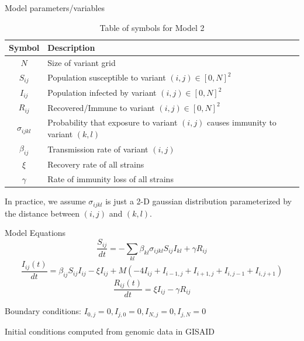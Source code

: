 \documentclass{beamer}
\begin{document}
\begin{frame}{Model parameters/variables}
    \begin{table}[h!]
        \begin{center}
        \begin{tabular}{c|p{8cm}}
                Symbol & Description \\
                \hline
                \hline
                $N$ & Size of variant grid \\
                $S_{ij}$ & Population susceptible to variant $(i,j) \in [0,N]^2$ \\
                $I_{ij}$ & Population infected by variant $(i,j) \in [0,N]^2$\\
                $R_{ij}$ & Recovered/Immune to variant $(i,j) \in [0,N]^2$\\
                $\sigma_{ijkl}$ & Probability that exposure to variant $(i,j)$ causes immunity \newline to variant $(k,l)$\\
                $\beta_{ij}$ & Transmission rate of variant $(i,j)$\\
                $\xi$ & Recovery rate of all strains \\
                $\gamma$ & Rate of immunity loss of all strains \\
        \end{tabular}
        \caption{Table of symbols for Model 2}
    
        \label{variables_2}
        \end{center}
    \end{table}
    In practice, we assume $\sigma_{ijkl}$ is just a 2-D gaussian distribution parameterized by the distance between $(i,j)$ and $(k,l)$.
\end{frame}
\begin{frame}{Model Equations}
    \small
    \begin{equation}
        \frac{S_{ij}}{dt} = -\sum_{kl} \beta_{kl} \sigma_{ijkl} S_{ij} I_{kl} + \gamma R_{ij}  \label{Seqn}
    \end{equation}
    \begin{equation}
        \frac{ I_{ij}(t)}{dt} = \beta_{ij} S_{ij} I_{ij} - \xi I_{ij} + M \left(- 4I_{ij} + I_{i-1,j}  + I_{i+1,j} + I_{i,j-1} + I_{i,j+1} \right) \label{Ieqn}    
    \end{equation}
    \begin{equation}
        \frac{R_{ij}(t)}{dt} = \xi I_{ij} - \gamma R_{ij}  \label{Reqn}
    \end{equation}

    Boundary conditions: $I_{0,j} = 0, I_{j,0} = 0,  I_{N,j} = 0, I_{j,N} = 0$

    Initial conditions computed from genomic data in GISAID 
\end{frame}
\begin{frame}[allowframebreaks]



\end{frame}
\end{document}
